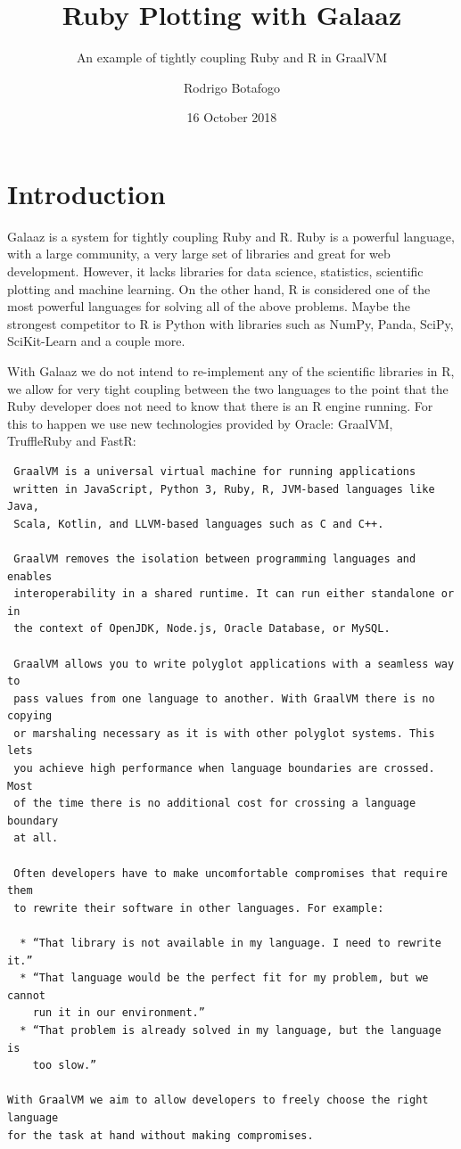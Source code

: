 \documentclass[11pt,]{article}
\title{Ruby Plotting with Galaaz}
\subtitle{An example of tightly coupling Ruby and R in GraalVM}
\author{Rodrigo Botafogo}
\date{16 October 2018}
\begin{document}
\maketitle

{
\setcounter{tocdepth}{2}
\tableofcontents
}
\hypertarget{introduction}{%
\section{Introduction}\label{introduction}}

Galaaz is a system for tightly coupling Ruby and R. Ruby is a powerful
language, with a large community, a very large set of libraries and
great for web development. However, it lacks libraries for data science,
statistics, scientific plotting and machine learning. On the other hand,
R is considered one of the most powerful languages for solving all of
the above problems. Maybe the strongest competitor to R is Python with
libraries such as NumPy, Panda, SciPy, SciKit-Learn and a couple more.

With Galaaz we do not intend to re-implement any of the scientific
libraries in R, we allow for very tight coupling between the two
languages to the point that the Ruby developer does not need to know
that there is an R engine running. For this to happen we use new
technologies provided by Oracle: GraalVM, TruffleRuby and FastR:

\begin{verbatim}
 GraalVM is a universal virtual machine for running applications
 written in JavaScript, Python 3, Ruby, R, JVM-based languages like Java,
 Scala, Kotlin, and LLVM-based languages such as C and C++.

 GraalVM removes the isolation between programming languages and enables
 interoperability in a shared runtime. It can run either standalone or in
 the context of OpenJDK, Node.js, Oracle Database, or MySQL.

 GraalVM allows you to write polyglot applications with a seamless way to
 pass values from one language to another. With GraalVM there is no copying
 or marshaling necessary as it is with other polyglot systems. This lets
 you achieve high performance when language boundaries are crossed. Most
 of the time there is no additional cost for crossing a language boundary
 at all.

 Often developers have to make uncomfortable compromises that require them
 to rewrite their software in other languages. For example:

  * “That library is not available in my language. I need to rewrite it.” 
  * “That language would be the perfect fit for my problem, but we cannot
    run it in our environment.” 
  * “That problem is already solved in my language, but the language is
    too slow.”

With GraalVM we aim to allow developers to freely choose the right language
for the task at hand without making compromises.
\end{verbatim}
\end{document}
